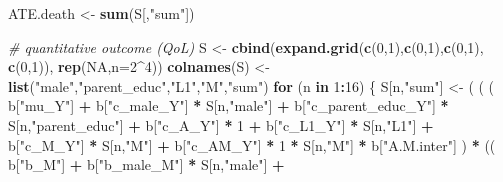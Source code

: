 \documentclass[
]{book}
\newenvironment{Shaded}{\begin{snugshade}}{\end{snugshade}}
\newcommand{\AttributeTok}[1]{\textcolor[rgb]{0.13,0.29,0.53}{#1}}
\newcommand{\CommentTok}[1]{\textcolor[rgb]{0.56,0.35,0.01}{\textit{#1}}}
\newcommand{\ConstantTok}[1]{\textcolor[rgb]{0.56,0.35,0.01}{#1}}
\newcommand{\ControlFlowTok}[1]{\textcolor[rgb]{0.13,0.29,0.53}{\textbf{#1}}}
\newcommand{\DecValTok}[1]{\textcolor[rgb]{0.00,0.00,0.81}{#1}}
\newcommand{\FunctionTok}[1]{\textcolor[rgb]{0.13,0.29,0.53}{\textbf{#1}}}
\newcommand{\NormalTok}[1]{#1}
\newcommand{\OtherTok}[1]{\textcolor[rgb]{0.56,0.35,0.01}{#1}}
\newcommand{\SpecialCharTok}[1]{\textcolor[rgb]{0.81,0.36,0.00}{\textbf{#1}}}
\newcommand{\StringTok}[1]{\textcolor[rgb]{0.31,0.60,0.02}{#1}}
\begin{document}
\begin{Shaded}
\begin{Highlighting}[]
\NormalTok{  ATE.death }\OtherTok{\textless{}{-}} \FunctionTok{sum}\NormalTok{(S[,}\StringTok{"sum"}\NormalTok{])}
  
  \CommentTok{\# quantitative outcome (QoL)}
\NormalTok{  S }\OtherTok{\textless{}{-}} \FunctionTok{cbind}\NormalTok{(}\FunctionTok{expand.grid}\NormalTok{(}\FunctionTok{c}\NormalTok{(}\DecValTok{0}\NormalTok{,}\DecValTok{1}\NormalTok{),}\FunctionTok{c}\NormalTok{(}\DecValTok{0}\NormalTok{,}\DecValTok{1}\NormalTok{),}\FunctionTok{c}\NormalTok{(}\DecValTok{0}\NormalTok{,}\DecValTok{1}\NormalTok{), }\FunctionTok{c}\NormalTok{(}\DecValTok{0}\NormalTok{,}\DecValTok{1}\NormalTok{)), }\FunctionTok{rep}\NormalTok{(}\ConstantTok{NA}\NormalTok{,}\AttributeTok{n=}\DecValTok{2}\SpecialCharTok{\^{}}\DecValTok{4}\NormalTok{))}
  \FunctionTok{colnames}\NormalTok{(S) }\OtherTok{\textless{}{-}} \FunctionTok{list}\NormalTok{(}\StringTok{"male"}\NormalTok{,}\StringTok{"parent\_educ"}\NormalTok{,}\StringTok{"L1"}\NormalTok{,}\StringTok{"M"}\NormalTok{,}\StringTok{"sum"}\NormalTok{)}
  \ControlFlowTok{for}\NormalTok{ (n }\ControlFlowTok{in} \DecValTok{1}\SpecialCharTok{:}\DecValTok{16}\NormalTok{) \{}
\NormalTok{    S[n,}\StringTok{"sum"}\NormalTok{] }\OtherTok{\textless{}{-}}\NormalTok{ ( ( ( b[}\StringTok{"mu\_Y"}\NormalTok{] }\SpecialCharTok{+} 
\NormalTok{                          b[}\StringTok{"c\_male\_Y"}\NormalTok{] }\SpecialCharTok{*}\NormalTok{ S[n,}\StringTok{"male"}\NormalTok{] }\SpecialCharTok{+} 
\NormalTok{                          b[}\StringTok{"c\_parent\_educ\_Y"}\NormalTok{] }\SpecialCharTok{*}\NormalTok{ S[n,}\StringTok{"parent\_educ"}\NormalTok{] }\SpecialCharTok{+}
\NormalTok{                          b[}\StringTok{"c\_A\_Y"}\NormalTok{] }\SpecialCharTok{*} \DecValTok{1} \SpecialCharTok{+}
\NormalTok{                          b[}\StringTok{"c\_L1\_Y"}\NormalTok{] }\SpecialCharTok{*}\NormalTok{ S[n,}\StringTok{"L1"}\NormalTok{] }\SpecialCharTok{+}
\NormalTok{                          b[}\StringTok{"c\_M\_Y"}\NormalTok{] }\SpecialCharTok{*}\NormalTok{ S[n,}\StringTok{"M"}\NormalTok{] }\SpecialCharTok{+} 
\NormalTok{                          b[}\StringTok{"c\_AM\_Y"}\NormalTok{] }\SpecialCharTok{*} \DecValTok{1} \SpecialCharTok{*}\NormalTok{ S[n,}\StringTok{"M"}\NormalTok{] }\SpecialCharTok{*}\NormalTok{ b[}\StringTok{"A.M.inter"}\NormalTok{] ) }\SpecialCharTok{*}
\NormalTok{                        (( b[}\StringTok{"b\_M"}\NormalTok{] }\SpecialCharTok{+} 
\NormalTok{                             b[}\StringTok{"b\_male\_M"}\NormalTok{] }\SpecialCharTok{*}\NormalTok{ S[n,}\StringTok{"male"}\NormalTok{] }\SpecialCharTok{+} 

\end{Highlighting}
\end{Shaded}
\end{document}
